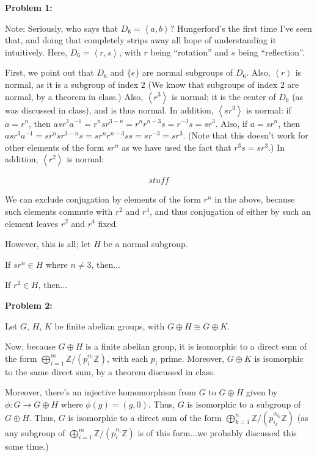 \documentclass[a4paper,12pt]{article}
\newcommand{\shunt}{\vspace{20mm}}
\newcommand{\anbrack}[1]{\left\langle #1 \right\rangle}
\newcommand{\al}{\alpha} %
\newcommand{\Z}{\mathbb{Z}}
\begin{document}
{\bf Problem 1:}

Note: Seriously, who says that $D_6 = \anbrack{a,b}$? Hungerford's the first time I've seen that, and doing that completely strips away all hope of understanding it intuitively. Here, $D_6 = \anbrack{r,s}$, with $r$ being ``rotation'' and $s$ being ``reflection''.

First, we point out that $D_6$ and $\{e\}$ are normal subgroups of $D_6$. Also, $\anbrack{r}$ is normal, as it is a subgroup of index $2$ (We know that subgroups of index $2$ are normal, by a theorem in class.) Also, $\anbrack{r^3}$ is normal; it is the center of $D_6$ (as was discussed in class), and is thus normal. In addition, $\anbrack{sr^3}$ is normal: if $a = r^n$, then $asr^3a^{-1} = r^nsr^{3-n} = r^nr^{n-3}s=r^{-3}s=sr^3$. Also, if $a=sr^n$, then $asr^3a^{-1} = sr^nsr^{3-n}s= sr^nr^{n-3}ss = sr^{-3}=sr^3$. (Note that this doesn't work for other elements of the form $sr^n$ as we have used the fact that $r^3s=sr^3$.) In addition, $\anbrack{r^2}$ is normal:

\begin{align*}
stuff
\end{align*}

We can exclude conjugation by elements of the form $r^n$ in the above, because such elements commute with $r^2$ and $r^4$, and thus conjugation of either by such an element leaves $r^2$ and $r^4$ fixed.

However, this is all; let $H$ be a normal subgroup.

If $sr^n \in H$ where $n \neq 3$, then... %

If $r^2 \in H$, then... %

\shunt

{\bf Problem 2:}

Let $G$, $H$, $K$ be finite abelian groups, with $G \oplus H \cong G \oplus K$.

Now, because $G \oplus H$ is a finite abelian group, it is isomorphic to a direct sum of the form $\bigoplus\limits_{i=1}^m \Z/(p_i^{\al_i}\Z)$, with each $p_i$ prime. Moreover, $G \oplus K$ is isomorphic to the same direct sum, by a theorem discussed in class.

Moreover, there's an injective homomorphism from $G$ to $G \oplus H$ given by $\phi: G \to G \oplus H$ where $\phi(g) = (g,0)$. Thus, $G$ is isomorphic to a subgroup of $G \oplus H$. Thus, $G$ is isomorphic to a direct sum of the form $\bigoplus\limits_{k=1}^n \Z/(p_{i_k}^{\al_{i_k}}\Z)$ (as any subgroup of $\bigoplus\limits_{i=1}^m \Z/(p_i^{\al_i}\Z)$ is of this form...we probably discussed this some time.)
\end{document}
